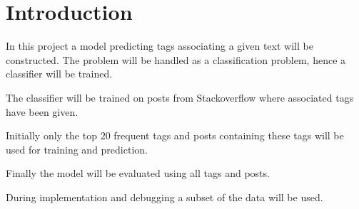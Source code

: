 
\section{Introduction}

In this project a model predicting tags associating a given text will be
constructed. The problem will be handled as a classification problem, hence
a classifier will be trained.

The classifier will be trained on posts from Stackoverflow where associated
tags have been given.

Initially only the top $20$ frequent tags and posts containing these tags will
be used for training and prediction.

Finally the model will be evaluated using all tags and posts.

During implementation and debugging a subset of the data will be used.
